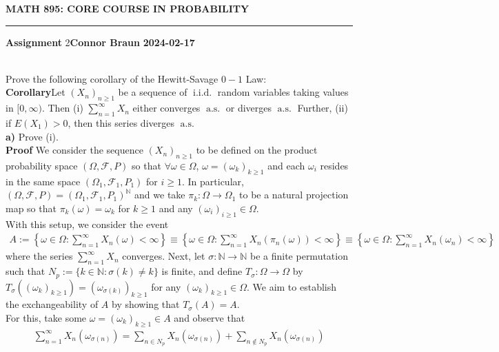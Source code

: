 \documentclass[10pt]{article}
\newcommand{\mbb}[1]{\mathbb{#1}}
\newcommand{\1}[1]{\mathbbm{1}_{#1}}
\newcommand{\mc}[1]{\mathcal{#1}}
\DeclareMathOperator{\as}{a.s.}
\DeclareMathOperator{\iid}{i.i.d.}
\begin{document}
    \begin{center}
        {\bf\large{MATH 895: CORE COURSE IN PROBABILITY}}
        \smallskip
        \hrule
        \smallskip
        {\bf Assignment} 2\hfill {\bf Connor Braun} \hfill {\bf 2024-02-17}
    \end{center}
    \\[5pt]
    Prove the following corollary of the Hewitt-Savage $0-1$ Law:\\[5pt]
    {\bf Corollary}\hspace{5pt}Let $(X_n)_{n\geq 1}$ be a sequence of $\iid$ random variables taking values in $[0,\infty)$. Then (i) $\sum_{n=1}^\infty X_n$ either converges $\as$ or diverges $\as$ Further, (ii) if $E(X_1)>0$, then this series diverges $\as$\\[5pt]
    {\bf a)}\hspace{5pt} Prove (i).\\[5pt]
    {\bf Proof}\hspace{5pt} We consider the sequence $(X_n)_{n\geq 1}$ to be defined on the product probability space $(\Omega,\mc{F},P)$ so that $\forall\omega\in\Omega$, $\omega=(\omega_k)_{k\geq 1}$ and each $\omega_i$ resides in the same space $(\Omega_1,\mc{F}_1,P_1)$ for $i\geq 1$. In particular, $(\Omega,\mc{F},P)=(\Omega_1,\mc{F}_1,P_1)^{\mbb{N}}$ and we take $\pi_k:\Omega\rightarrow\Omega_1$ to be a natural projection map so that $\pi_k(\omega)=\omega_k$ for $k\geq 1$ and any $(\omega_i)_{i\geq 1}\in\Omega$.\\[5pt]
    With this setup, we consider the event
    \begin{align*}
        A:=\left\{\omega\in\Omega:\sum_{n=1}^\infty X_n(\omega)<\infty\right\}\equiv\left\{\omega\in\Omega:\sum_{n=1}^\infty X_n(\pi_n(\omega))<\infty\right\}\equiv \left\{\omega\in\Omega:\sum_{n=1}^\infty X_n(\omega_n)<\infty\right\}
    \end{align*}
    where the series $\sum_{n=1}^\infty X_n$ converges. Next, let $\sigma:\mbb{N}\rightarrow\mbb{N}$ be a finite permutation such that $N_p:=\{k\in\mbb{N}:\sigma(k)\neq k\}$ is finite, and define $T_\sigma:\Omega\rightarrow\Omega$ by $T_\sigma((\omega_k)_{k\geq 1})=(\omega_{\sigma(k)})_{k\geq 1}$ for any $(\omega_k)_{k\geq 1}\in\Omega$. We aim to establish the exchangeability of $A$ by showing that $T_\sigma(A)=A$.\\[5pt]
    For this, take some $\omega=(\omega_k)_{k\geq 1}\in A$ and observe that
    \begin{align*}
        \sum_{n=1}^\infty X_n(\omega_{\sigma(n)})=\sum_{n\in N_p}X_n(\omega_{\sigma(n)})+\sum_{n\notin N_p}X_n(\omega_{\sigma(n)})
    \end{align*}
\end{document}
